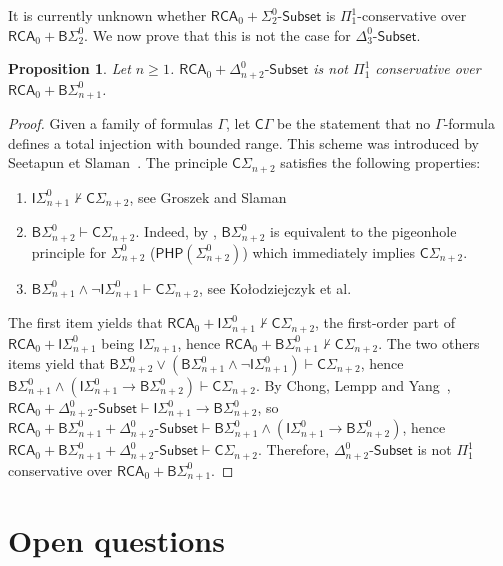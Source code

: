 \documentclass{article}
\newcommand{\ISig}{\mathsf{I}\Sigma^0}
\newcommand{\BSig}{\mathsf{B}\Sigma^0}
\newcommand{\CSig}{\mathsf{C}\Sigma}
\newcommand{\Sub}[1]{{#1}\mbox{-}\mathsf{Subset}}
\newcommand{\RCA}{\mathsf{RCA}}
\numberwithin{theorem}{section}
\newtheorem{proposition}[theorem]{Proposition}
\theoremstyle{definition}
\begin{document}
It is currently unknown whether $\RCA_0 + \Sub{\Sigma^0_2}$ is $\Pi^1_1$-conservative over~$\RCA_0 + \BSig_2$. We now prove that this is not the case for $\Sub{\Delta^0_3}$.

\begin{proposition}\label{prop:delta3-bsig2-conservation}
    Let $n \geq 1$. $\RCA_0 + \Sub{\Delta^0_{n+2}}$ is not $\Pi_1^1$ conservative over $\RCA_0 + \BSig_{n+1}$.
\end{proposition}

\begin{proof}
Given a family of formulas $\Gamma$, let $\mathsf{C}\Gamma$ be the statement that no $\Gamma$-formula defines a total injection with bounded range. This scheme was introduced by Seetapun et Slaman~\cite{seetapun1995strength}.
The principle $\CSig_{n+2}$ satisfies the following properties:

\begin{enumerate}
    \item $\ISig_{n+1} \not \vdash \CSig_{n+2}$, see Groszek and Slaman \cite{groszek1994turing}
    \item $\BSig_{n+2} \vdash \CSig_{n+2}$. Indeed, by \cite[Theorem 2.23]{hajek2017metamathematics}, $\BSig_{n+2}$ is equivalent to the pigeonhole principle for $\Sigma^0_{n+2}$ ($\mathsf{PHP}(\Sigma^0_{n+2})$) which immediately implies $\CSig_{n+2}$.
    \item $\BSig_{n+1} \wedge \neg \ISig_{n+1} \vdash \CSig_{n+2}$, see  Ko\l odziejczyk et al. \cite{kolodziejczyk2023strong} 
\end{enumerate}

The first item yields that $\RCA_0 + \ISig_{n+1} \not \vdash \CSig_{n+2}$, the first-order part of $\RCA_0 + \ISig_{n+1}$ being $\mathsf{I}\Sigma_{n+1}$, hence $\RCA_0 + \BSig_{n+1} \not \vdash \CSig_{n+2}$. 
The two others items yield that $\BSig_{n+2} \vee (\BSig_{n+1} \wedge \neg \ISig_{n+1}) \vdash \CSig_{n+2}$, hence $\BSig_{n+1} \wedge (\ISig_{n+1} \to \BSig_{n+2}) \vdash \CSig_{n+2}$. By Chong, Lempp and Yang~\cite{chong2010role}, $\RCA_0 + \Sub{\Delta^0_{n+2}} \vdash \ISig_{n+1} \to \BSig_{n+2}$, so $\RCA_0 + \BSig_{n+1} + \Sub{\Delta^0_{n+2}} \vdash \BSig_{n+1} \wedge (\ISig_{n+1} \to \BSig_{n+2})$, hence $\RCA_0 + \BSig_{n+1} + \Sub{\Delta^0_{n+2}} \vdash \CSig_{n+2}$.
Therefore, $\Sub{\Delta^0_{n+2}}$ is not $\Pi_1^1$ conservative over $\RCA_0 + \BSig_{n+1}$.
\end{proof}

\section{Open questions}\label{sect:open-questions}
\end{document}
